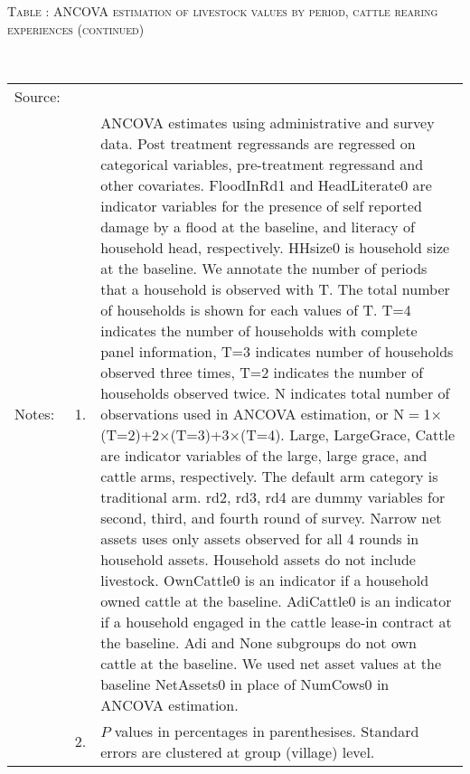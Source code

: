 \addtocounter{table}{-1}
\hspace{-1cm}\begin{minipage}[t]{14cm}
\hfil\textsc{\normalsize Table \thetable: ANCOVA estimation of livestock values by period, cattle rearing experiences (continued) \label{tab ANCOVA livestock values Experience timevarying 2}}\\
\setlength{\tabcolsep}{1pt}
\setlength{\baselineskip}{8pt}
\renewcommand{\arraystretch}{.52}
\hfil{}\\
\renewcommand{\arraystretch}{.8}
\setlength{\tabcolsep}{1pt}
\begin{tabular}{>{\hfill\scriptsize}p{1cm}<{}>{\hfill\scriptsize}p{.25cm}<{}>{\scriptsize}p{12cm}<{\hfill}}
Source:& \multicolumn{2}{l}{\scriptsize Estimated with GUK administrative and survey data.}\\
Notes: & 1. & ANCOVA estimates using administrative and survey data. Post treatment regressands are regressed on categorical variables, pre-treatment regressand and other covariates. \textsf{FloodInRd1} and \textsf{HeadLiterate0} are indicator variables for the presence of self reported damage by a flood at the baseline, and literacy of household head, respectively. \textsf{HHsize0} is household size at the baseline. We annotate the number of periods that a household is observed with \textsf{T}. The total number of households is shown for each values of \textsf{T}. \textsf{T=4} indicates the number of households with complete panel information, \textsf{T=3} indicates number of households observed three times, \textsf{T=2} indicates the number of households observed twice. \textsf{N} indicates total number of observations used in ANCOVA estimation, or \textsf{N$=$1$\times$(T=2)+2$\times$(T=3)+3$\times$(T=4)}.  \textsf{Large}, \textsf{LargeGrace}, \textsf{Cattle} are indicator variables of the \textsf{large}, \textsf{large grace}, and \textsf{cattle} arms, respectively. The default arm category is \textsf{traditional} arm. \textsf{rd2, rd3, rd4} are dummy variables for second, third, and fourth round of survey. Narrow net assets uses only assets observed for all 4 rounds in household assets. Household assets do not include livestock. \textsf{OwnCattle0} is an indicator if a household owned cattle at the baseline. \textsf{AdiCattle0} is an indicator if a household engaged in the cattle lease-in contract at the baseline.  \textsf{Adi} and \textsf{None} subgroups do not own cattle at the baseline. We used net asset values at the baseline \textsf{NetAssets0} in place of \textsf{NumCows0} in ANCOVA estimation.\\
& 2. & $P$ values in percentages in parenthesises. Standard errors are clustered at group (village) level.
\end{tabular}
\end{minipage}
